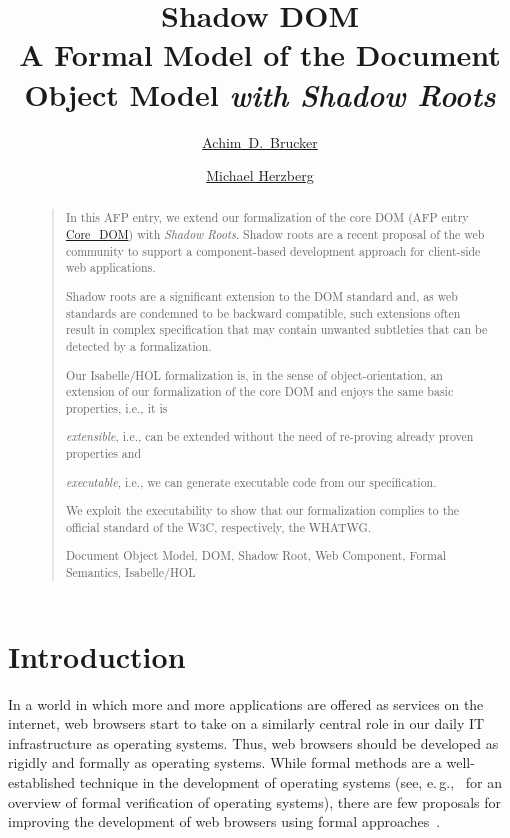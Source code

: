 \documentclass[10pt,DIV16,a4paper,abstract=true,twoside=semi,openright]
{scrreprt}
\title{Shadow DOM\\\medskip \Large 
  A Formal Model of the Document Object Model \emph{with Shadow Roots}}%
\author{%
  \href{https://www.brucker.ch/}{Achim~D.~Brucker}\footnotemark[1]
  \and
  \href{https://www.michael-herzberg.de/}{Michael Herzberg}\footnotemark[2]
}
\newcommand{\eg}{e.\,g.\xspace}
\begin{document}
  \maketitle
  \begin{abstract}
    \begin{quote}
      In this AFP entry, we extend our formalization of the core DOM
      (AFP entry \href{https://www.isa-afp.org/entries/Core_DOM.html}
      {Core\_DOM}) with \emph{Shadow Roots}. Shadow roots are a recent
      proposal of the web community to support a component-based
      development approach for client-side web applications. 

      Shadow roots are a significant extension to the DOM standard
      and, as web standards are condemned to be backward compatible,
      such extensions often result in complex specification that may
      contain unwanted subtleties that can be detected by a
      formalization.

      Our Isabelle/HOL formalization is, in the sense of
      object-orientation, an extension of our formalization of the
      core DOM and enjoys the same basic properties, i.e., it is
      \begin{inparaenum}
        \item \emph{extensible}, i.e., can be extended without the need of
              re-proving already proven properties and
        \item \emph{executable}, i.e., we can generate executable code
          from our specification.
      \end{inparaenum}
      We exploit the executability to show that our formalization
      complies to the official standard of the W3C, respectively,
      the WHATWG.

      \bigskip
      Document Object Model, DOM, Shadow Root, Web Component, Formal
      Semantics, Isabelle/HOL
    \end{quote}
  \end{abstract}


\tableofcontents
\cleardoublepage

\chapter{Introduction}

In a world in which more and more applications are offered as services
on the internet, web browsers start to take on a similarly central
role in our daily IT infrastructure as operating systems. Thus, web
browsers should be developed as rigidly and formally as operating
systems. While formal methods are a well-established technique in the
development of operating systems (see,
\eg,~\citet{klein:operating:2009} for an overview of formal
verification of operating systems), there are few proposals for
improving the development of web browsers using formal
approaches~\cite{gardner.ea:dom:2008,raad.ea:dom:2016,jang.ea:establishing:2012,bohannon.ea:featherweight:2010}.
\end{document}
